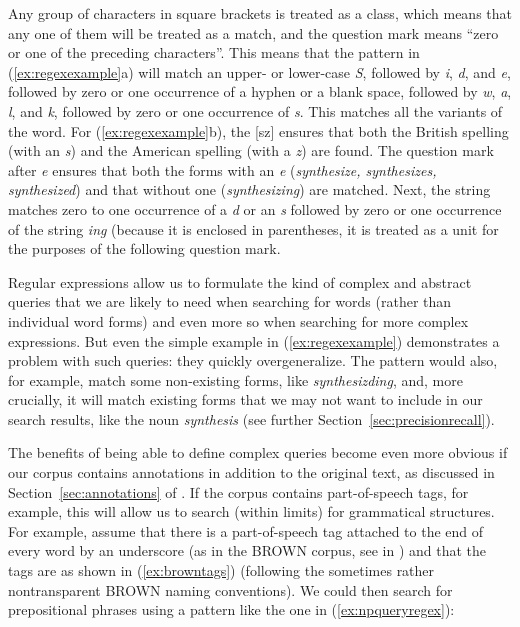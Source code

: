 Any group of characters in square brackets is treated as a class, which means that any one of them will be treated as a match, and the question mark means ``zero or one of the preceding characters''. This means that the pattern in (\ref{ex:regexexample}a) will match an upper- or lower\hyp{}case \textit{S}, followed by \textit{i}, \textit{d}, and \textit{e}, followed by zero or one occurrence of a hyphen or a blank space, followed by \textit{w}, \textit{a}, \textit{l}, and \textit{k}, followed by zero or one occurrence of \textit{s}. This matches all the variants of the word. For (\ref{ex:regexexample}b), the [sz] ensures that both the British  spelling (with an \textit{s}) and the American  spelling (with a \textit{z}) are found. The question mark after \textit{e} ensures that both the forms with an \textit{e} (\textit{synthesize, synthesizes, synthesized}) and that without one (\textit{synthesizing}) are matched. Next, the string matches zero to one occurrence of a \textit{d} or an \textit{s} followed by zero or one occurrence of the string \textit{ing} (because it is enclosed in parentheses, it is treated as a unit for the purposes of the following question mark.

Regular expressions allow us to formulate the kind of complex and abstract queries  that we are likely to need when searching for words (rather than individual word forms) and even more so when searching for more complex expressions. But even the simple example in (\ref{ex:regexexample}) demonstrates a problem with such queries: they quickly overgeneralize. The pattern would also, for example, match some non\hyp{}existing forms, like \textit{synthesizding}, and, more crucially, it will match existing forms that we may not want to include in our search results, like the noun  \textit{synthesis} (see further Section~\ref{sec:precisionrecall}).

The benefits of being able to define complex queries  become even more obvious if our corpus contains annotations  in addition to the original text, as discussed in Section~\ref{sec:annotations} of . If the corpus contains part\hyp{}of\hyp{}speech tags, for example, this will allow us to search (within limits) for grammatical structures. For example, assume that there is a part\hyp{}of\hyp{}speech tag  attached to the end of every word by an underscore (as in the BROWN  corpus, see  in ) and that the tags are as shown in (\ref{ex:browntags}) (following the sometimes rather nontransparent BROWN  naming conventions). We could then search for prepositional  phrases using a pattern like the one in  (\ref{ex:npqueryregex}):


